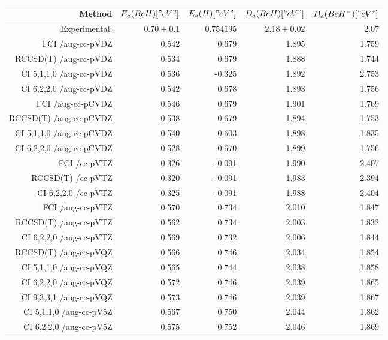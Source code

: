 
\centering
\label{TODO}
\begin{tabular}{rrrrr}
\toprule
Method & $E_a(BeH)[" eV"]$ & $E_a(H)[" eV"]$ & $D_a(BeH)[" eV"]$ & $D_a(BeH^-)[" eV"]$ \\ \midrule
    Experimental:  & $0.70\pm0.1$ & $0.754195$        & $2.18\pm0.02$ & $2.07$ \\ \midrule
FCI  /aug-cc-pVDZ & 0.542 & 0.679 & 1.895 & 1.759\\
RCCSD(T)  /aug-cc-pVDZ & 0.534 & 0.679 & 1.888 & 1.744\\
CI 5,1,1,0 /aug-cc-pVDZ & 0.536 & -0.325 & 1.892 & 2.753\\
CI 6,2,2,0 /aug-cc-pVDZ & 0.542 & 0.678 & 1.893 & 1.756\\
FCI  /aug-cc-pCVDZ & 0.546 & 0.679 & 1.901 & 1.769\\
RCCSD(T)  /aug-cc-pCVDZ & 0.538 & 0.679 & 1.894 & 1.753\\
CI 5,1,1,0 /aug-cc-pCVDZ & 0.540 & 0.603 & 1.898 & 1.835\\
CI 6,2,2,0 /aug-cc-pCVDZ & 0.528 & 0.670 & 1.899 & 1.756\\
FCI  /cc-pVTZ & 0.326 & -0.091 & 1.990 & 2.407\\
RCCSD(T)  /cc-pVTZ & 0.320 & -0.091 & 1.983 & 2.394\\
CI 6,2,2,0 /cc-pVTZ & 0.325 & -0.091 & 1.988 & 2.404\\
FCI  /aug-cc-pVTZ & 0.570 & 0.734 & 2.010 & 1.847\\
RCCSD(T)  /aug-cc-pVTZ & 0.562 & 0.734 & 2.003 & 1.832\\
CI 6,2,2,0 /aug-cc-pVTZ & 0.569 & 0.732 & 2.006 & 1.844\\
RCCSD(T)  /aug-cc-pVQZ & 0.566 & 0.746 & 2.034 & 1.854\\
CI 5,1,1,0 /aug-cc-pVQZ & 0.565 & 0.744 & 2.038 & 1.858\\
CI 6,2,2,0 /aug-cc-pVQZ & 0.572 & 0.746 & 2.039 & 1.865\\
CI 9,3,3,1 /aug-cc-pVQZ & 0.573 & 0.746 & 2.039 & 1.867\\
CI 5,1,1,0 /aug-cc-pV5Z & 0.567 & 0.750 & 2.044 & 1.862\\
CI 6,2,2,0 /aug-cc-pV5Z & 0.575 & 0.752 & 2.046 & 1.869\\
\bottomrule
\end{tabular}

    